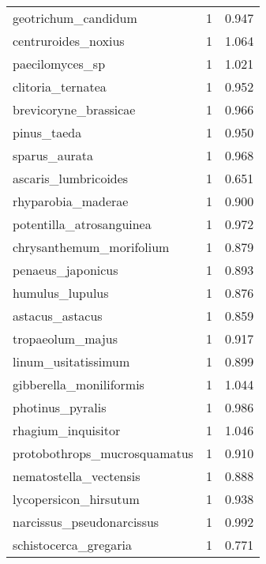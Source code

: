 \begin{tabular}{lrr}
            geotrichum\_candidum &                   1 &     0.947 \\
            centruroides\_noxius &                   1 &     1.064 \\
                paecilomyces\_sp &                   1 &     1.021 \\
              clitoria\_ternatea &                   1 &     0.952 \\
          brevicoryne\_brassicae &                   1 &     0.966 \\
                    pinus\_taeda &                   1 &     0.950 \\
                  sparus\_aurata &                   1 &     0.968 \\
           ascaris\_lumbricoides &                   1 &     0.651 \\
             rhyparobia\_maderae &                   1 &     0.900 \\
       potentilla\_atrosanguinea &                   1 &     0.972 \\
       chrysanthemum\_morifolium &                   1 &     0.879 \\
              penaeus\_japonicus &                   1 &     0.893 \\
                humulus\_lupulus &                   1 &     0.876 \\
                astacus\_astacus &                   1 &     0.859 \\
               tropaeolum\_majus &                   1 &     0.917 \\
            linum\_usitatissimum &                   1 &     0.899 \\
        gibberella\_moniliformis &                   1 &     1.044 \\
               photinus\_pyralis &                   1 &     0.986 \\
             rhagium\_inquisitor &                   1 &     1.046 \\
   protobothrops\_mucrosquamatus &                   1 &     0.910 \\
         nematostella\_vectensis &                   1 &     0.888 \\
          lycopersicon\_hirsutum &                   1 &     0.938 \\
      narcissus\_pseudonarcissus &                   1 &     0.992 \\
          schistocerca\_gregaria &                   1 &     0.771 \\

\end{tabular}
